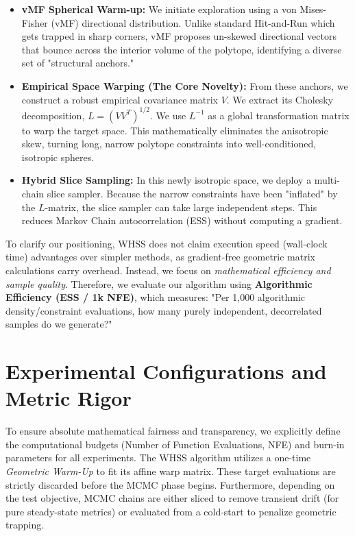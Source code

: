 \documentclass[12pt]{article}
\begin{document}
\begin{itemize}
    \item \textbf{vMF Spherical Warm-up:} We initiate exploration using a von Mises-Fisher (vMF) directional distribution. Unlike standard Hit-and-Run which gets trapped in sharp corners, vMF proposes un-skewed directional vectors that bounce across the interior volume of the polytope, identifying a diverse set of "structural anchors."
    \item \textbf{Empirical Space Warping (The Core Novelty):} From these anchors, we construct a robust empirical covariance matrix $V$. We extract its Cholesky decomposition, $L = (V V^T)^{1/2}$. We use $L^{-1}$ as a global transformation matrix to warp the target space. This mathematically eliminates the anisotropic skew, turning long, narrow polytope constraints into well-conditioned, isotropic spheres. 
    \item \textbf{Hybrid Slice Sampling:} In this newly isotropic space, we deploy a multi-chain slice sampler. Because the narrow constraints have been "inflated" by the $L$-matrix, the slice sampler can take large independent steps. This reduces Markov Chain autocorrelation (ESS) without computing a gradient.
\end{itemize}

To clarify our positioning, WHSS does not claim execution speed (wall-clock time) advantages over simpler methods, as gradient-free geometric matrix calculations carry overhead. Instead, we focus on \textit{mathematical efficiency and sample quality}. Therefore, we evaluate our algorithm using \textbf{Algorithmic Efficiency (ESS / 1k NFE)}, which measures: "Per 1,000 algorithmic density/constraint evaluations, how many purely independent, decorrelated samples do we generate?"

\section{Experimental Configurations and Metric Rigor}
To ensure absolute mathematical fairness and transparency, we explicitly define the computational budgets (Number of Function Evaluations, NFE) and burn-in parameters for all experiments. The WHSS algorithm utilizes a one-time \emph{Geometric Warm-Up} to fit its affine warp matrix. These target evaluations are strictly discarded before the MCMC phase begins. Furthermore, depending on the test objective, MCMC chains are either sliced to remove transient drift (for pure steady-state metrics) or evaluated from a cold-start to penalize geometric trapping.
\end{document}
